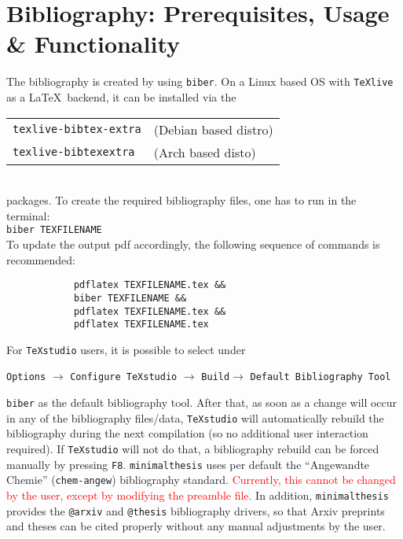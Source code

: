 \documentclass{./class/minimalthesis}
\begin{document}
	\chapter{Bibliography: Prerequisites, Usage \& Functionality}
		The bibliography is created by using \verb|biber|. On a Linux based OS with \verb|TeXlive| as a \LaTeX~backend, it can be installed via the\\[0.125cm]
		\begin{tabular}{ll}
			\verb|texlive-bibtex-extra|& (Debian based distro)\\
			\verb|texlive-bibtexextra|& (Arch based disto)
		\end{tabular}\\
		packages.
		\newline To create the required bibliography files, one has to run in the terminal:\\
		\verb|biber TEXFILENAME|\\
		To update the output pdf accordingly, the following sequence of commands is recommended:\\[-1cm]
		\begin{verbatim}
			pdflatex TEXFILENAME.tex &&
			biber TEXFILENAME &&
			pdflatex TEXFILENAME.tex &&
			pdflatex TEXFILENAME.tex 
		\end{verbatim} 
		\vspace{-0.5cm}
		For \verb|TeXstudio| users, it is possible to select under\\[-1cm]
		\begin{center}
			\verb|Options| $\rightarrow$ 
			\verb|Configure TeXstudio| $\rightarrow$
			\verb|Build|$ \rightarrow$
			\verb|Default Bibliography Tool| 
		\end{center}
		\vspace{-0.5cm}
		\verb|biber| as the default bibliography tool. After that, as soon as a change will occur in any of the bibliography files/data, \verb|TeXstudio| will automatically rebuild the bibliography during the next compilation (so no additional user interaction required). If \verb|TeXstudio| will not do that, a bibliography rebuild can be forced manually by pressing \verb|F8|.
		\newline \verb|minimalthesis| uses per default the \enquote{Angewandte Chemie} (\verb|chem-angew|) bibliography standard. \textcolor{red}{Currently, this cannot be changed by the user, except by modifying the preamble file.} 
		\newline In addition, \verb|minimalthesis| provides the \verb|@arxiv| \cite{arxivExample} and \verb|@thesis| \cite{thesisExample} bibliography drivers, so that Arxiv preprints and theses can be cited properly without any manual adjustments by the user.
		
\end{document}
